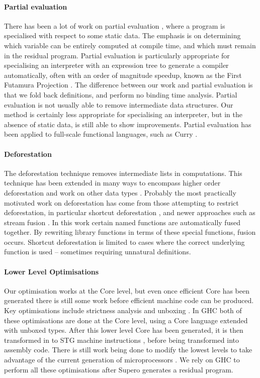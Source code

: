 \documentclass{llncs}
\begin{document}
\paragraph{Partial evaluation} There has been a lot of work on partial evaluation \cite{jones:partial_evaluation}, where a program is specialised with respect to some static data. The emphasis is on determining which variable can be entirely computed at compile time, and which must remain in the residual program. Partial evaluation is particularly appropriate for specialising an interpreter with an expression tree to generate a compiler automatically, often with an order of magnitude speedup, known as the First Futamura Projection \cite{futanama:projections}. The difference between our work and partial evaluation is that we fold back definitions, and perform no binding time analysis. Partial evaluation is not usually able to remove intermediate data structures. Our method is certainly less appropriate for specialising an interpreter, but in the absence of static data, is still able to show improvements. Partial evaluation has been applied to full-scale functional languages, such as Curry \cite{albert:partial_evaluation_curry}.

\paragraph{Deforestation} The deforestation technique \cite{wadler:deforestation} removes intermediate lists in computations. This technique has been extended in many ways to encompass higher order deforestation \cite{marlow:higher_order_deforestation} and work on other data types \cite{coutts:string_fusion}. Probably the most practically motivated work on deforestation has come from those attempting to restrict deforestation, in particular shortcut deforestation \cite{gill:shortcut_deforestation}, and newer approaches such as stream fusion \cite{coutts:stream_fusion}. In this work certain named functions are automatically fused together. By rewriting library functions in terms of these special functions, fusion occurs. Shortcut deforestation is limited to cases where the correct underlying function is used -- sometimes requiring unnatural definitions.

\paragraph{Lower Level Optimisations} Our optimisation works at the Core level, but even once efficient Core has been generated there is still some work before efficient machine code can be produced. Key optimisations include strictness analysis and unboxing \cite{spj:unboxing}. In GHC both of these optimisations are done at the Core level, using a Core language extended with unboxed types. After this lower level Core has been generated, it is then transformed in to STG machine instructions \cite{spj:stg}, before being transformed into assembly code. There is still work being done to modify the lowest levels to take advantage of the current generation of microprocessors \cite{marlow:pointer_tagging}. We rely on GHC to perform all these optimisations after Supero generates a residual program.
\end{document}
